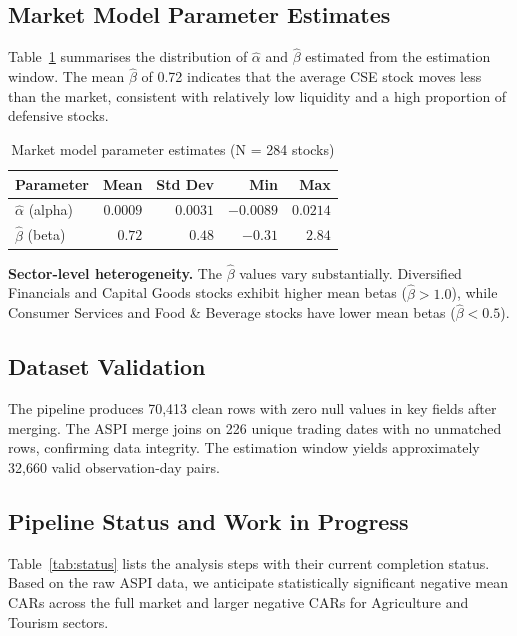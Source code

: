 \documentclass[sigconf, nonacm]{acmart}
\begin{document}
\subsection{Market Model Parameter Estimates}
Table~\ref{tab:params} summarises the distribution of $\hat{\alpha}$ and $\hat{\beta}$ estimated from the estimation window. The mean $\hat{\beta}$ of 0.72 indicates that the average CSE stock moves less than the market, consistent with relatively low liquidity and a high proportion of defensive stocks.

\begin{table}[h]
  \centering
  \caption{Market model parameter estimates (N = 284 stocks)}
  \label{tab:params}
  \small
  \begin{tabular}{@{}lrrrr@{}}
    \toprule
    \textbf{Parameter} & \textbf{Mean} & \textbf{Std Dev} & \textbf{Min} & \textbf{Max} \\
    \midrule
    $\hat{\alpha}$ (alpha) & $0.0009$ & $0.0031$ & $-0.0089$ & $0.0214$ \\
    $\hat{\beta}$ (beta)   & $0.72$   & $0.48$   & $-0.31$   & $2.84$ \\
    \bottomrule
  \end{tabular}
\end{table}

\textbf{Sector-level heterogeneity.} The $\hat{\beta}$ values vary substantially. Diversified Financials and Capital Goods stocks exhibit higher mean betas ($\hat{\beta} > 1.0$), while Consumer Services and Food \& Beverage stocks have lower mean betas ($\hat{\beta} < 0.5$).

\subsection{Dataset Validation}
The pipeline produces 70,413 clean rows with zero null values in key fields after merging. The ASPI merge joins on 226 unique trading dates with no unmatched rows, confirming data integrity. The estimation window yields approximately 32,660 valid observation-day pairs.

\subsection{Pipeline Status and Work in Progress}
Table~\ref{tab:status} lists the analysis steps with their current completion status. Based on the raw ASPI data, we anticipate statistically significant negative mean CARs across the full market and larger negative CARs for Agriculture and Tourism sectors.
\end{document}
